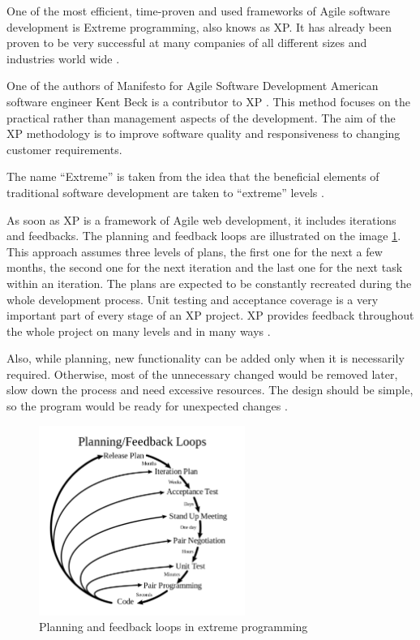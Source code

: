 One of the most efficient, time-proven and used frameworks of Agile software development is Extreme programming, also knows as XP. It has already been proven to be very successful at many companies of all different sizes and industries world wide \cite{xp_intro}.

One of the authors of Manifesto for Agile Software Development American software engineer Kent Beck is a contributor to XP \cite{xp_explained}. This method focuses on the practical rather than management aspects of the development. The aim of the XP methodology is to improve software quality and responsiveness to changing customer requirements.

The name ``Extreme'' is taken from the idea that the beneficial elements of traditional software development are taken to ``extreme'' levels \cite[Preface]{xp_explained}.

As soon as XP is a framework of Agile web development, it includes iterations and feedbacks. The planning and feedback loops are illustrated on the image \ref{fig:xp_loop}. This approach assumes three levels of plans, the first one for the next a few months, the second one for the next iteration and the last one for the next task within an iteration. The plans are expected to be constantly recreated during the whole development process. Unit testing and acceptance coverage is a very important part of every stage of an XP project. XP provides feedback throughout the whole project on many levels and in many ways \cite[Planning/Feedback loops]{xp_intro}.

Also, while planning, new functionality can be added only when it is necessarily required. Otherwise, most of the unnecessary changed would be removed later, slow down the process and need excessive resources. The design should be simple, so the program would be ready for unexpected changes \cite{xp_early}.

\begin{figure}[h]
    \centerline{\includegraphics[width=0.6\textwidth]{images/xp_loop}}
    \caption{Planning and feedback loops in extreme programming}
    \label{fig:xp_loop}
\end{figure}

